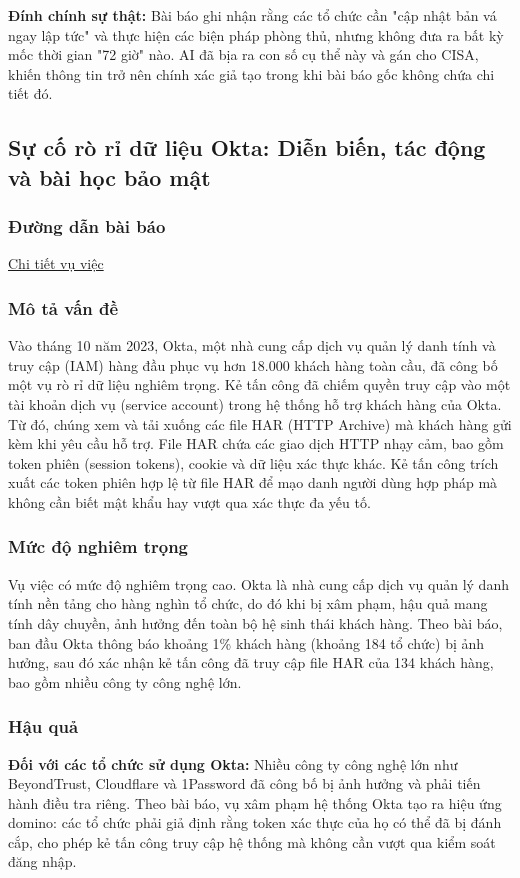 \textbf{Đính chính sự thật:}
Bài báo ghi nhận rằng các tổ chức cần "cập nhật bản vá ngay lập tức" và thực hiện các biện pháp phòng thủ, nhưng không đưa ra bất kỳ mốc thời gian "72 giờ" nào. AI đã bịa ra con số cụ thể này và gán cho CISA, khiến thông tin trở nên chính xác giả tạo trong khi bài báo gốc không chứa chi tiết đó.

\subsection{Sự cố rò rỉ dữ liệu Okta: Diễn biến, tác động và bài học bảo mật}

\subsubsection{Đường dẫn bài báo}
\href{https://www.nightfall.ai/blog/okta-data-breach-what-happened-impact-and-security-lessons-learned}{Chi tiết vụ việc}

\subsubsection{Mô tả vấn đề}
Vào tháng 10 năm 2023, Okta, một nhà cung cấp dịch vụ quản lý danh tính và truy cập (IAM) hàng đầu phục vụ hơn 18.000 khách hàng toàn cầu, đã công bố một vụ rò rỉ dữ liệu nghiêm trọng. Kẻ tấn công đã chiếm quyền truy cập vào một tài khoản dịch vụ (service account) trong hệ thống hỗ trợ khách hàng của Okta. Từ đó, chúng xem và tải xuống các file HAR (HTTP Archive) mà khách hàng gửi kèm khi yêu cầu hỗ trợ. File HAR chứa các giao dịch HTTP nhạy cảm, bao gồm token phiên (session tokens), cookie và dữ liệu xác thực khác. Kẻ tấn công trích xuất các token phiên hợp lệ từ file HAR để mạo danh người dùng hợp pháp mà không cần biết mật khẩu hay vượt qua xác thực đa yếu tố.

\subsubsection{Mức độ nghiêm trọng}
Vụ việc có mức độ nghiêm trọng cao. Okta là nhà cung cấp dịch vụ quản lý danh tính nền tảng cho hàng nghìn tổ chức, do đó khi bị xâm phạm, hậu quả mang tính dây chuyền, ảnh hưởng đến toàn bộ hệ sinh thái khách hàng. Theo bài báo, ban đầu Okta thông báo khoảng 1\% khách hàng (khoảng 184 tổ chức) bị ảnh hưởng, sau đó xác nhận kẻ tấn công đã truy cập file HAR của 134 khách hàng, bao gồm nhiều công ty công nghệ lớn.

\subsubsection{Hậu quả}
\textbf{Đối với các tổ chức sử dụng Okta:} Nhiều công ty công nghệ lớn như BeyondTrust, Cloudflare và 1Password đã công bố bị ảnh hưởng và phải tiến hành điều tra riêng. Theo bài báo, vụ xâm phạm hệ thống Okta tạo ra hiệu ứng domino: các tổ chức phải giả định rằng token xác thực của họ có thể đã bị đánh cắp, cho phép kẻ tấn công truy cập hệ thống mà không cần vượt qua kiểm soát đăng nhập.


